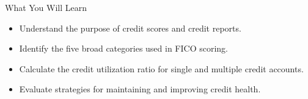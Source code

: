 \begin{block}{What You Will Learn}
  \begin{itemize}
    \item Understand the purpose of credit scores and credit reports.
    \item Identify the five broad categories used in FICO scoring.
    \item Calculate the credit utilization ratio for single and multiple credit accounts.
    \item Evaluate strategies for maintaining and improving credit health.
  \end{itemize}
\end{block}
